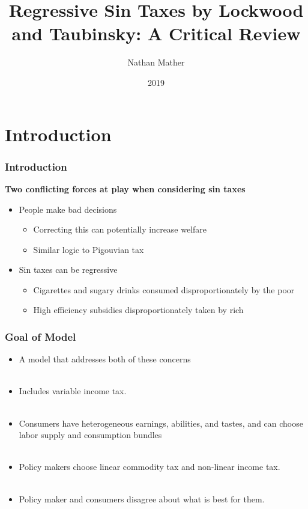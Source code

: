 \documentclass{beamer}
\title{Regressive Sin Taxes by Lockwood and Taubinsky: A Critical Review}
\author{Nathan Mather}
\institute{University of Michigan}
\date{2019}
\begin{document}
	
	
	
	\frame{\titlepage}
	
\section{Introduction}
	
	\begin{frame}
	\frametitle{Introduction}

\textbf{Two conflicting forces at play when considering sin taxes }
\begin{itemize}
	\item People make bad decisions
	\begin{itemize}
		\item Correcting this can potentially increase welfare
		\item Similar logic to Pigouvian tax
	\end{itemize}
	\item Sin taxes can be regressive 
	\begin{itemize}
		\item Cigarettes and sugary drinks consumed disproportionately by the poor
		\item High efficiency subsidies disproportionately taken by rich
	\end{itemize}
\end{itemize}


\end{frame}


	\begin{frame}
\frametitle{Goal of Model}

\begin{itemize}

\item A model that addresses both of these concerns  \\~\\

\item Includes variable income tax. \\~\\

\item Consumers have heterogeneous earnings, abilities, and tastes, and can choose labor supply and consumption bundles\\~\\

\item Policy makers choose linear commodity tax and non-linear income tax. \\~\\

\item Policy maker and consumers disagree about what is best for them.

	
\end{itemize} 
\end{frame}
\end{document}
